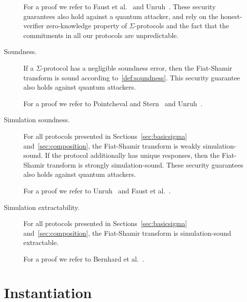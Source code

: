 \documentclass[runningheads]{llncs}
\begin{document}
\begin{description}
    For a proof we refer to Faust et al.~\cite{INDOCRYPT:FKMV12} and Unruh~\cite{AC:Unruh17}. These security guarantees also hold against a quantum attacker, and rely on the honest-verifier zero-knowledge property of $\Sigma$-protocols and the fact that the commitments in all our protocols are unpredictable.
  \item[Soundness.]
    If a $\Sigma$-protocol has a negligible soundness error, then the Fiat-Shamir transform is sound according to~\cref{def:soundness}.
    This security guarantee also holds against quantum attackers.

    For a proof we refer to Pointcheval and Stern~\cite{JC:PoiSte00} and Unruh~\cite{AC:Unruh17}.
  \item[Simulation soundness.]
    For all protocols presented in Sections~\ref{sec:basicsigma} and~\ref{sec:composition}, the Fiat-Shamir transform is  weakly simulation-sound.
    If the protocol additionally has unique responses, then the Fiat-Shamir transform is  strongly simulation-sound.
    These security guarantees also holds against quantum attackers.

    For a proof we refer to Unruh~\cite{AC:Unruh17} and Faust et al.~\cite{INDOCRYPT:FKMV12}.
  \item[Simulation extractability.]
    For all protocols presented in Sections~\ref{sec:basicsigma} and~\ref{sec:composition}, the Fiat-Shamir transform is  simulation-sound extractable.

    For a proof we refer to Bernhard et al.~\cite{AC:BerPerWar12}.
\end{description}

\section{Instantiation}
\label{sec:instantiation}
\end{document}
